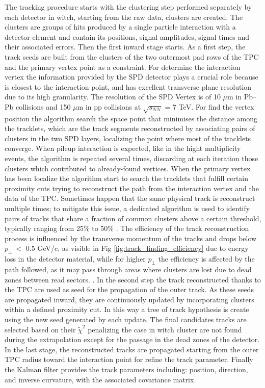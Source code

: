 \documentclass[12pt,a4paper]{book}
\begin{document}
The tracking procedure starts with the clustering step performed separately by each detector in witch, starting from the raw data, clusters are created. The clusters are groups of hits produced by a single particle interaction with a detector element and contain its positions, signal amplitudes, signal times and their associated errors. Then the first inward stage starts. As a first step, the track seeds are built from the clusters of the two outermost pad rows of the TPC and the primary vertex point as a constraint. For determine the interaction vertex the information provided by the SPD detector plays a crucial role because is closest to the interaction point, and has excellent transverse plane resolution due to its high granularity. The resolution of the SPD Vertex is of 10 $\mu$m in Pb–Pb collisions and 150 $\mu$m in pp collisions at $\sqrt{s_{NN}}$ = 7 TeV. For find the vertex position the algorithm search the space point that minimises the distance among the tracklets, which are the track segments reconstructed by associating pairs of clusters in the two SPD layers, localizing the point where most of the tracklets converge. When pileup interaction is expected, like in the hight multiplicity events,  the algorithm is repeated several times, discarding at each iteration those clusters which contributed to already-found vertices. When the primary vertex has been localize the algorithm start to search the tracklets that fulfill certain proximity cuts trying to reconstruct the path from the interaction vertex and the data of the TPC. Sometimes happen that the same physical track is reconstruct multiple times; to mitigate this issue, a dedicated algorithm is used to identify pairs of tracks that share a fraction of common clusters above a certain threshold, typically ranging from 25\% to 50\% . 
The efficiency of the track reconstruction process is influenced by the transverse momentum of the tracks and drops below $p_\perp \ <$ 0.5 GeV/c, as visible in Fig \ref{fig:track_finding_efficiency} due to energy loss in the detector material, while for higher $p_\perp$ the efficiency is affected by the path followed, as it may pass through areas where clusters are lost due to dead zones between read sectors. \cite{Padhan:2924203}.
In the second step the track reconstructed thanks to the TPC are used as seed for the propagation of the outer track. As these seeds are propagated inward, they are continuously updated by  incorporating clusters within a defined proximity cut. In this way a tree of track hypothesis is create using the new seed generated by each update. The final candidates tracks are selected based on their $\tilde{\chi}^2$ penalizing the case in witch cluster are not found during the extrapolation except for the passage in the dead zones of the detector. In the last stage, the reconstructed tracks are propagated starting from the outer TPC radius toward the interaction point for refine the track parameter. Finally the Kalman filter provides the track parameters including: position, direction, and inverse curvature, with the associated covariance matrix.    
\end{document}
